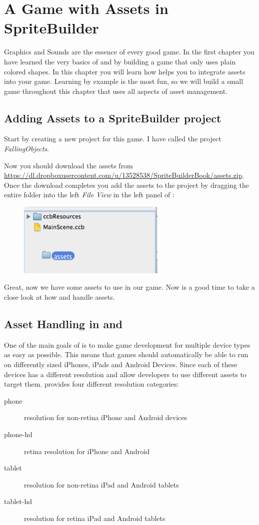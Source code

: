 \chapter{A Game with Assets in SpriteBuilder}

Graphics and Sounds are the essence of every good game. In the first chapter
you have learned the very basics of \SB{} and \cocos{} by building a game that only
uses plain colored shapes. In this chapter you will learn how \SB{} helps you to
integrate assets into your game. Learning by example is the most fun, so we will
build a small game throughout this chapter that uses all aspects of asset
management.

\section{Adding Assets to a SpriteBuilder project}
Start by creating a new \SB{} project for this game. I have called the
project \textit{FallingObjects}.

Now you should download the assets from
\url{https://dl.dropboxusercontent.com/u/13528538/SpriteBuilderBook/assets.zip}.
Once the download completes you add the assets to the project by dragging the
entire folder into the left \textit{File View} in the left panel of
\SB{}:

\begin{figure}[H]
		\centering
		\includegraphics[width=200pt]{images/Chapter2/DragAssets.png}
\end{figure}

Great, now we have some assets to use in our game. Now is a good time to take a
close look at how \SB{} and \cocos{} handle assets.

\section{Asset Handling in \SB{} and \cocos{}}
One of the main goals of \SB{} is to make game development for multiple device
types as easy as possible. This means that games should automatically be able to
run on differently sized iPhones, iPads and Android Devices. Since each of these
devices has a different resolution \cocos{} and \SB{} allow developers to use different assets to target them. \SB{}
provides four different resolution categories:
\begin{description}
\item[phone] resolution for non-retina iPhone and Android devices
\item[phone-hd] retina resolution for iPhone and Android
\item[tablet] resolution for non-retina iPad and Android tablets
\item[tablet-hd] resolution for retina iPad and Android tablets
\end{description}

